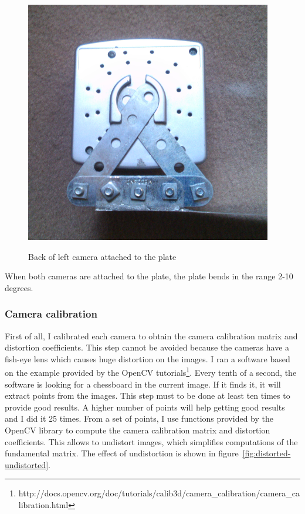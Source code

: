 \documentclass[12pt]{article}
\begin{document}
\begin{figure}[h]
    \begin{center}
        \includegraphics[scale=0.3]{images/attachleft.png} 
        \label{fig:attach-left}
        \caption{Back of left camera attached to the plate}
    \end{center}
\end{figure}

When both cameras are attached to the plate, the plate bends in the range 2-10 degrees.

\subsubsection{Camera calibration}

First of all, I calibrated each camera to obtain the camera calibration matrix and distortion coefficients. This step cannot be avoided because the cameras have a fish-eye lens which causes huge distortion on the images.
I ran a software based on the example provided by the OpenCV tutorials\footnote{http://docs.opencv.org/doc/tutorials/calib3d/camera\_calibration/camera\_calibration.html}. Every tenth of a second, the software is looking for a chessboard in the current image. If it finds it, it will extract points from the images. This step must to be done at least ten times to provide good results. A higher number of points will help getting good results and I did it 25 times. From a set of points, I use functions provided by the OpenCV library to compute the camera calibration matrix and distortion coefficients. This allows to undistort images, which simplifies computations of the fundamental matrix. The effect of undistortion is shown in figure~\ref{fig:distorted-undistorted}.
\end{document}
